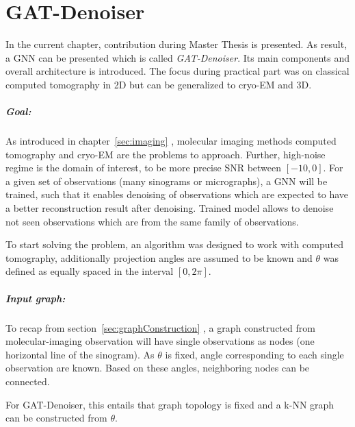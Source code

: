 \chapter{GAT-Denoiser}
\label{sec:contribution}

In the current chapter, contribution during Master Thesis is presented.
As result, a GNN can be presented which is called \textit{GAT-Denoiser}.
Its main components and overall architecture is introduced.
The focus during practical part was on classical computed tomography in 2D but
can be generalized to cryo-EM and 3D.

\paragraph{Goal:}
As introduced in chapter~\ref{sec:imaging} \textit{}, molecular imaging methods computed tomography and cryo-EM are the problems
to approach. Further, high-noise regime is the domain of interest, to be more precise SNR between $[-10, 0]$.
For a given set of observations (many sinograms or micrographs), a GNN will be trained, such that
it enables denoising of observations which are expected to have a better reconstruction result after denoising.
Trained model allows to denoise not seen observations which are from the same family of observations.


\begin{tcolorbox}[colback=red!5!white,colframe=red!75!black]
  To start solving the problem, an algorithm was designed to work with computed tomography, additionally
  projection angles are assumed to be known and $\theta$ was defined as equally spaced 
  in the interval $[0, 2 \pi]$. 
\end{tcolorbox}

\paragraph{Input graph:}
To recap from section~\ref{sec:graphConstruction}  \textit{}, 
a graph constructed from molecular-imaging observation will have single observations as nodes (one horizontal line of the sinogram). 
As $\theta$ is fixed, angle corresponding to each single observation are known. 
Based on these angles, neighboring nodes can be connected.

\begin{tcolorbox}[colback=red!5!white,colframe=red!75!black]
  For GAT-Denoiser, this entails that graph topology is fixed and
  a k-NN graph can be constructed from $\theta$.
\end{tcolorbox}


